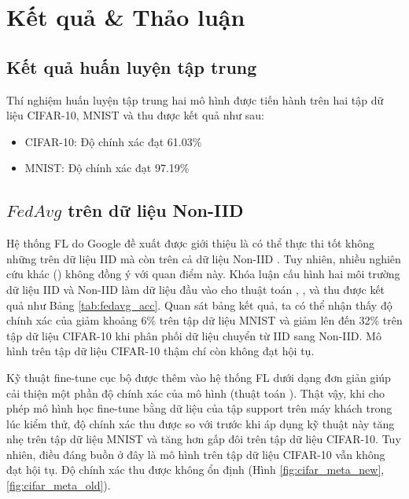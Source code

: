 \chapter{Kết quả \& Thảo luận}
\label{Chapter5}

\section{Kết quả huấn luyện tập trung}

Thí nghiệm huấn luyện tập trung hai mô hình được tiến hành trên hai tập dữ liệu CIFAR-10, MNIST và thu được kết quả như sau:

\begin{itemize}
    \item CIFAR-10: Độ chính xác đạt 61.03\%
    \item MNIST: Độ chính xác đạt 97.19\%
\end{itemize}

\section{$FedAvg$ trên dữ liệu Non-IID}

Hệ thống FL do Google đề xuất được giới thiệu là có thể thực thi tốt không những trên dữ liệu IID mà còn trên cả dữ liệu Non-IID \cite{mcmahan2017communication}. Tuy nhiên, nhiều nghiên cứu khác (\parencite{chen2018federated, zhao2018federated, zhu2021federated, wang2019federated}) không đồng ý với quan điểm này. Khóa luận cấu hình hai môi trường dữ liệu IID và Non-IID làm dữ liệu đầu vào cho thuật toán , ,  và thu được kết quả như Bảng \ref{tab:fedavg_acc}. Quan sát bảng kết quả, ta có thể nhận thấy độ chính xác của  giảm khoảng 6\% trên tập dữ liệu MNIST và giảm lên đến 32\% trên tập dữ liệu CIFAR-10 khi phân phối dữ liệu chuyển từ IID sang Non-IID. Mô hình trên tập dữ liệu CIFAR-10 thậm chí còn không đạt hội tụ.

Kỹ thuật fine-tune cục bộ được thêm vào hệ thống FL dưới dạng đơn giản giúp cải thiện một phần độ chính xác của mô hình (thuật toán ). Thật vậy, khi cho phép mô hình học fine-tune bằng dữ liệu của tập support trên máy khách trong lúc kiểm thử, độ chính xác thu được so với trước khi áp dụng kỹ thuật này tăng nhẹ trên tập dữ liệu MNIST và tăng hơn gấp đôi trên tập dữ liệu CIFAR-10. Tuy nhiên, điều đáng buồn ở đây là mô hình trên tập dữ liệu CIFAR-10 vẫn không đạt hội tụ. Độ chính xác thu được không ổn định (Hình \ref{fig:cifar_meta_new}, \ref{fig:cifar_meta_old}).

